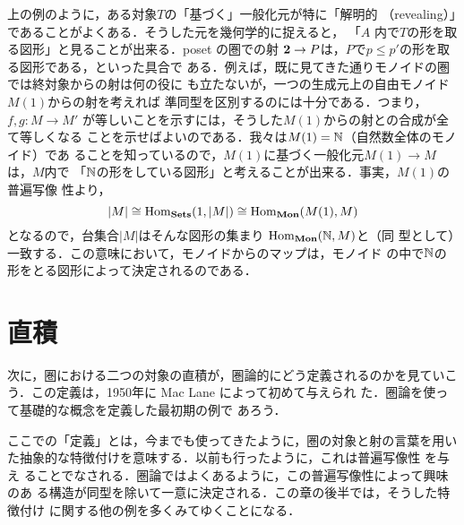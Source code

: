 \begin{example}
 上の例のように，ある対象$T$の「基づく」一般化元が特に「解明的
 （revealing）」であることがよくある．そうした元を幾何学的に捉えると，
 「$A$ 内で$T$の形を取る図形」と見ることが出来る．poset の圏での射
 ${\bf 2} \to P$は，$P$で$p \leq p'$の形を取る図形である，といった具合で
 ある．例えば，既に見てきた通りモノイドの圏では終対象からの射は何の役に
 も立たないが，一つの生成元上の自由モノイド$M(1)$からの射を考えれば
 準同型を区別するのには十分である．つまり，$f, g: M \to M'$
 が等しいことを示すには，そうした$M(1)$からの射との合成が全て等しくなる
 ことを示せばよいのである．我々は$M(1) = \mathbb{N}$（自然数全体のモノイド）であ
 ることを知っているので，$M(1)$に基づく一般化元$M(1) \to M$は，$M$内で
 「$\mathbb{N}$の形をしている図形」と考えることが出来る．事実，$M(1)$の普遍写像
 性より，
 \[
  |M| \cong \mathrm{Hom}_{\mathbf{Sets}}(1, |M|) \cong \mathrm{Hom}_{\mathbf{Mon}}(M(1), M)
 \]
 となるので，台集合$|M|$はそんな図形の集まり $\mathrm{Hom}_{\mathbf{Mon}}(\mathbb{N}, M)$と（同
 型として）一致する．この意味において，モノイドからのマップは，モノイド
 の中で$\mathbb{N}$の形をとる図形によって決定されるのである．
\end{example}
\section{直積}
次に，圏における二つの対象の直積が，圏論的にどう定義されるのかを見ていこ
う．この定義は，1950年に Mac Lane によって初めて与えられ
た．圏論を使って基礎的な概念を定義した最初期の例で
あろう．

ここでの「定義」とは，今までも使ってきたように，圏の対象と射の言葉を用い
た抽象的な特徴付けを意味する．以前も行ったように，これは普遍写像性
を与え
ることでなされる．圏論ではよくあるように，この普遍写像性によって興味のあ
る構造が同型を除いて一意に決定される．この章の後半では，そうした特徴付け
に関する他の例を多くみてゆくことになる．

